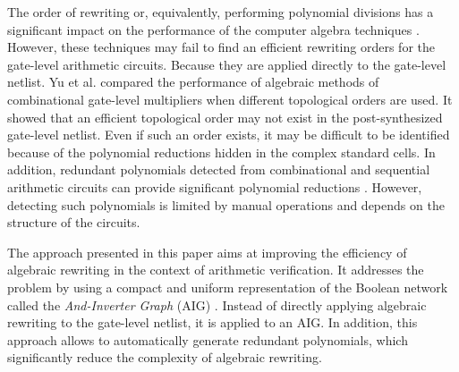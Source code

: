 The order of rewriting or, equivalently, performing polynomial divisions has a significant impact on the performance of the computer algebra techniques \cite{sayedformal:date-2016}\cite{yu:2016-tcad-verification}. However, these techniques may fail to find an efficient rewriting orders for the gate-level arithmetic circuits. Because they are applied directly to the gate-level netlist. Yu et al. \cite{yu:2016-tcad-verification} compared the performance of algebraic methods of combinational gate-level multipliers when different topological orders are used. It showed that an efficient topological order may not exist in the post-synthesized gate-level netlist. Even if such an order exists, it may be difficult to be identified because of the polynomial reductions hidden in the complex standard cells. In addition, redundant polynomials detected from combinational and sequential arithmetic circuits can provide significant polynomial reductions \cite{yu-isvlsi-16a}. However, detecting such polynomials is limited by manual operations and depends on the structure of the circuits.

The approach presented in this paper aims at improving the efficiency of algebraic rewriting in the context of arithmetic verification. It addresses the problem by using a compact and uniform representation of the Boolean network called the \textit{And-Inverter Graph} (AIG) \cite{mishchenko:2006-dag}. Instead of directly applying algebraic rewriting to the gate-level netlist, it is applied to an AIG. In addition, this approach allows to automatically generate redundant polynomials, which significantly reduce the complexity of algebraic rewriting. 





